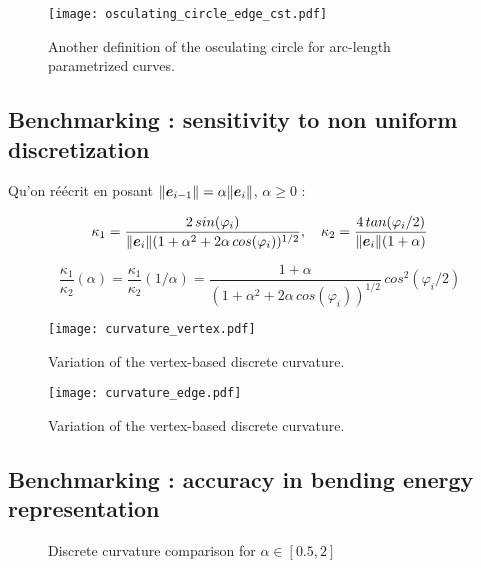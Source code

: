 \begin{figure}[H]
\begin{center}
\texttt{[image: osculating\_circle\_edge\_cst.pdf]}
\caption{Another definition of the osculating circle for arc-length parametrized curves.}
\label{fig:1_1}
\end{center}
\end{figure}


\subsection{Benchmarking : sensitivity to non uniform discretization}
Qu'on réécrit en posant $\lVert\boldsymbol{e}_{i-1}\rVert = \alpha \lVert\boldsymbol{e}_{i}\rVert$, $\alpha \geq 0$ :

\begin{equation}
	\kappa_1 = \frac{2 \,sin(\varphi_i)}{\lVert\boldsymbol{e}_{i}\rVert(1+ \alpha^2 + 2 \alpha \, cos(\varphi_i))^{1/2}},
	\quad
	\kappa_2 = \frac{4 \,tan(\varphi_i/2)}{\lVert\boldsymbol{e}_{i}\rVert(1+\alpha)}
\end{equation}

\begin{equation}
	\frac{\kappa_1}{\kappa_2}(\alpha) = \frac{\kappa_1}{\kappa_2}(1/\alpha)= \frac{1+\alpha}{(1+ \alpha^2 + 2 \alpha \, cos(\varphi_i))^{1/2}} \, cos^2(\varphi_i/2)
\end{equation}

\begin{figure}[b]
\begin{center}
\texttt{[image: curvature\_vertex.pdf]}
\caption{Variation of the vertex-based discrete curvature.}
\label{fig:vertexbased}
\texttt{[image: curvature\_edge.pdf]}
\caption{Variation of the vertex-based discrete curvature.}
\label{fig:edgebased}
\end{center}
\end{figure}


\subsection{Benchmarking : accuracy in bending energy representation}

\begin{figure}[b]
\begin{center}

\end{center}
\caption{Discrete curvature comparison for $\alpha \in [0.5,2]$}
\end{figure}


